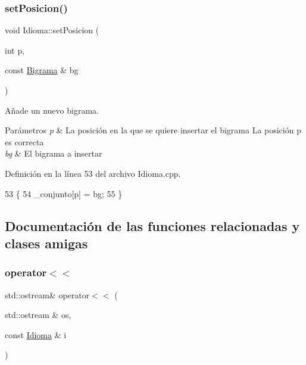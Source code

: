 \subsubsection{\texorpdfstring{set\+Posicion()}{setPosicion()}}
{\footnotesize\ttfamily void Idioma\+::set\+Posicion (\begin{DoxyParamCaption}\item[{int}]{p,  }\item[{const \hyperlink{classBigrama}{Bigrama} \&}]{bg }\end{DoxyParamCaption})}



Añade un nuevo bigrama. 


\begin{DoxyParams}{Parámetros}
{\em p} & La posición en la que se quiere insertar el bigrama  La posición {\ttfamily p} es correcta \\
\hline
{\em bg} & El bigrama a insertar \\
\hline
\end{DoxyParams}


Definición en la línea 53 del archivo Idioma.\+cpp.


\begin{DoxyCode}
53                                                   \{
54     \_conjunto[p] = bg;
55 \}
\end{DoxyCode}


\subsection{Documentación de las funciones relacionadas y clases amigas}
\mbox{\label{classIdioma_a0b5cc80627118f2e81ba4a598b049038}} 
\subsubsection{\texorpdfstring{operator$<$$<$}{operator<<}}
{\footnotesize\ttfamily std\+::ostream\& operator$<$$<$ (\begin{DoxyParamCaption}\item[{std\+::ostream \&}]{os,  }\item[{const \hyperlink{classIdioma}{Idioma} \&}]{i }\end{DoxyParamCaption})\hspace{0.3cm}{\ttfamily [friend]}}



